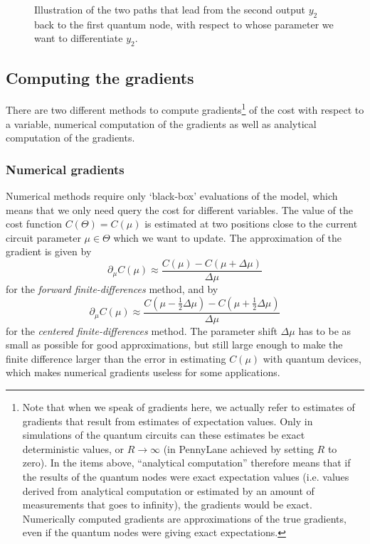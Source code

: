\documentclass[aps,pra,10pt,twocolumn,groupedaddress,nofootinbib]{revtex4-1}
\theoremstyle{plain}
\begin{document}
\begin{figure}[t]
\begin{tikzpicture}
\end{tikzpicture}
\caption{Illustration of the two paths that lead from the second output $y_2$ back to the first quantum node, with respect to whose parameter we want to differentiate $y_2$.}
\label{}
\end{figure}

\subsection{Computing the gradients}

There are two different methods to compute gradients\footnote{Note that when we speak of gradients here, we actually refer to estimates of gradients that result from estimates of expectation values. Only in simulations of the quantum circuits can these estimates be exact deterministic values, or $R \rightarrow \infty$ (in PennyLane achieved by setting $R$ to zero). In the items above, ``analytical computation'' therefore means that if the results of the quantum nodes were exact expectation values (i.e. values derived from analytical computation or estimated by an amount of measurements that goes to infinity), the gradients would be exact. Numerically computed gradients are approximations of the true gradients, even if the quantum nodes were giving exact expectations.} of the cost with respect to a variable, numerical computation of the gradients as well as analytical computation of the gradients.


\subsubsection{Numerical gradients}

Numerical methods require only `black-box' evaluations of the model, which means that we only need query the cost for different variables. The value of the cost function $C(\Theta) = C(\mu)$ is estimated at two positions close to the current circuit parameter $\mu \in \Theta$ which we want to update. The approximation of the gradient is given by
\[ \partial_{\mu} C(\mu) \approx \frac{C(\mu ) - C(\mu + \Delta \mu)}{\Delta \mu} \]
for the \textit{forward finite-differences} method, and by
\[ \partial_{\mu} C(\mu) \approx \frac{C(\mu - \frac{1}{2}\Delta \mu ) - C(\mu + \frac{1}{2} \Delta \mu)}{\Delta \mu} \]
for the \textit{centered finite-differences} method. The parameter shift $\Delta \mu$ has to be as small as possible for good approximations, but still large enough to make the finite difference larger than the error in estimating $C(\mu)$ with quantum devices, which makes numerical gradients useless for some applications.
\end{document}

